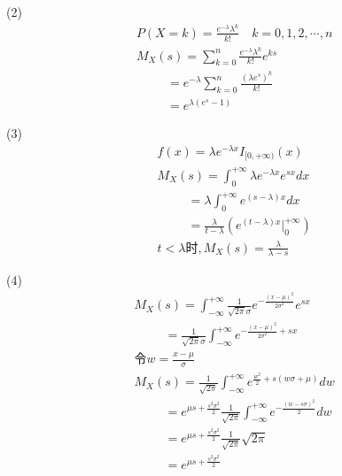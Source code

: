 \documentclass{article}
\begin{document}
(2)
\begin{equation}
    \begin{aligned}
        &P(X=k)=\frac{e^{-\lambda}\lambda^k}{k!}\quad k=0,1,2,\cdots,n\\\nonumber
        &M_X(s)=\sum_{k=0}^n\frac{e^{-\lambda}\lambda^k}{k!}e^{ks}\\
        &\qquad\ \ =e^{-\lambda}\sum_{k=0}^n\frac{(\lambda e^s)^k}{k!}\\
        &\qquad\ \ =e^{\lambda(e^s-1)}
    \end{aligned}
\end{equation}

(3)
\begin{equation}
    \begin{aligned}
        &f(x)=\lambda e^{-\lambda x}I_{[0,+\infty)}(x)\\\nonumber
        &M_X(s)=\int_0^{+\infty}\lambda e^{-\lambda x}e^{sx}dx\\
        &\qquad\ \ =\lambda\int_0^{+\infty}e^{(s-\lambda)x}dx\\
        &\qquad\ \ =\frac{\lambda}{t-\lambda}(e^{(t-\lambda)x}|_0^{+\infty})\\
        &t<\lambda\mbox{时},M_X(s)=\frac{\lambda}{\lambda-s}
    \end{aligned}
\end{equation}

(4)
\begin{equation}
    \begin{aligned}
        &M_X(s)=\int_{-\infty}^{+\infty}\frac{1}{\sqrt{2\pi}\sigma}e^{-\frac{(x-\mu)^2}{2\sigma^2}}e^{sx}\\\nonumber
        &\qquad\ \ =\frac{1}{\sqrt{2\pi}\sigma}\int_{-\infty}^{+\infty}e^{-\frac{(x-\mu)^2}{2\sigma^2}+sx}\\
        &\mbox{令}w=\frac{x-\mu}{\sigma}\\
        &M_X(s)=\frac{1}{\sqrt{2\pi}}\int_{-\infty}^{+\infty}e^{\frac{w^2}{2}+s(w\sigma+\mu)}dw\\
        &\qquad\ \ =e^{\mu s+\frac{s^2\sigma^2}{2}}\frac{1}{\sqrt{2\pi}}\int_{-\infty}^{+\infty}e^{-\frac{(w-s\sigma)^2}{2}}dw\\
        &\qquad\ \ =e^{\mu s+\frac{s^2\sigma^2}{2}}\frac{1}{\sqrt{2\pi}}\sqrt{2\pi}\\
        &\qquad\ \ =e^{\mu s+\frac{s^2\sigma^2}{2}}
    \end{aligned}
\end{equation}

\section{ }
\end{document}
